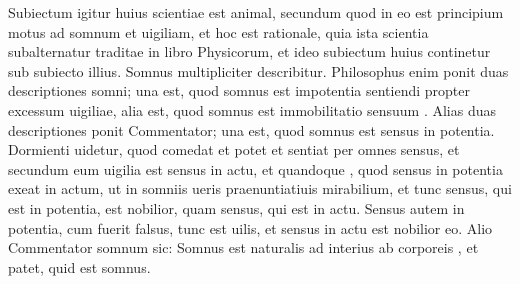 \documentclass{article}
\begin{document}
\meaning\textdir
\beginnumbering
\pstart
Subiectum igitur huius scientiae est animal, secundum quod in
eo est principium motus ad somnum et uigiliam, et hoc est rationale,
quia ista scientia subalternatur
 traditae in libro
Physicorum, et ideo subiectum huius continetur sub subiecto illius.
Somnus multipliciter describitur. Philosophus enim ponit duas
descriptiones somni; una est, quod somnus est impotentia sentiendi
propter excessum uigiliae, alia est, quod somnus est immobilitatio
sensuum . Alias duas descriptiones ponit Commentator;
una est, quod somnus est sensus in potentia. Dormienti
 uidetur, quod comedat et potet
et sentiat per omnes  sensus, et secundum eum uigilia est sensus in
actu, et quandoque ,
quod sensus in potentia exeat in actum, ut in somniis ueris
praenuntiatiuis mirabilium, et tunc sensus, qui est in potentia, est
nobilior, quam sensus, qui est in actu. Sensus autem in potentia, cum
fuerit falsus, tunc est uilis, et sensus in actu est nobilior eo. Alio
 Commentator somnum
sic: Somnus est 
 naturalis ad interius
ab  corporeis
,
et  patet, quid est somnus.
\pend
\endnumbering
\end{document}
